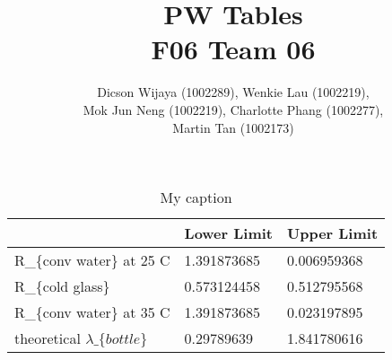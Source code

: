 \documentclass[12pt,a4paper]{article}
\author{Dicson Wijaya (1002289), Wenkie Lau (1002219), \\ Mok Jun Neng (1002219), Charlotte Phang (1002277), \\ Martin Tan (1002173)}
\title{PW Tables\\ F06 Team 06}
\begin{document}
	\begin{table}[]
		\centering
		\caption{My caption}
		\label{my-label}
		\begin{tabular}{|l|l|l|}
			\hline
			& Lower Limit & Upper Limit \\ \hline
			\multicolumn{1}{|c|}{R\_\{conv water\} at 25 C} & 1.391873685 & 0.006959368 \\ \hline
			R\_\{cold glass\}                                       & 0.573124458 & 0.512795568 \\ \hline
			R\_\{conv water\} at 35 C                       & 1.391873685 & 0.023197895 \\ \hline
			theoretical $\lambda\_\{bottle\}$                         & 0.29789639  & 1.841780616 \\ \hline
		\end{tabular}
	\end{table}
\end{document}
